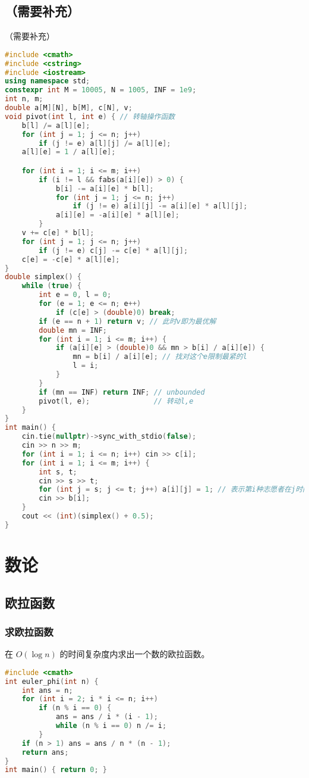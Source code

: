 \documentclass[9pt, a4paper, oneside]{book}
\begin{document}
\subsection{（需要补充）}
（需要补充）
\begin{lstlisting}[language={C++}]
#include <cmath>
#include <cstring>
#include <iostream>
using namespace std;
constexpr int M = 10005, N = 1005, INF = 1e9;
int n, m;
double a[M][N], b[M], c[N], v;
void pivot(int l, int e) { // 转轴操作函数
    b[l] /= a[l][e];
    for (int j = 1; j <= n; j++)
        if (j != e) a[l][j] /= a[l][e];
    a[l][e] = 1 / a[l][e];

    for (int i = 1; i <= m; i++)
        if (i != l && fabs(a[i][e]) > 0) {
            b[i] -= a[i][e] * b[l];
            for (int j = 1; j <= n; j++)
                if (j != e) a[i][j] -= a[i][e] * a[l][j];
            a[i][e] = -a[i][e] * a[l][e];
        }
    v += c[e] * b[l];
    for (int j = 1; j <= n; j++)
        if (j != e) c[j] -= c[e] * a[l][j];
    c[e] = -c[e] * a[l][e];
}
double simplex() {
    while (true) {
        int e = 0, l = 0;
        for (e = 1; e <= n; e++)
            if (c[e] > (double)0) break;
        if (e == n + 1) return v; // 此时v即为最优解
        double mn = INF;
        for (int i = 1; i <= m; i++) {
            if (a[i][e] > (double)0 && mn > b[i] / a[i][e]) {
                mn = b[i] / a[i][e]; // 找对这个e限制最紧的l
                l = i;
            }
        }
        if (mn == INF) return INF; // unbounded
        pivot(l, e);               // 转动l,e
    }
}
int main() {
    cin.tie(nullptr)->sync_with_stdio(false);
    cin >> n >> m;
    for (int i = 1; i <= n; i++) cin >> c[i];
    for (int i = 1; i <= m; i++) {
        int s, t;
        cin >> s >> t;
        for (int j = s; j <= t; j++) a[i][j] = 1; // 表示第i种志愿者在j时间可以服务
        cin >> b[i];
    }
    cout << (int)(simplex() + 0.5);
}\end{lstlisting}
\section{数论}
\subsection{欧拉函数}
\subsubsection{求欧拉函数}
在 $O(\log n)$ 的时间复杂度内求出一个数的欧拉函数。
\begin{lstlisting}[language={C++}]
#include <cmath>
int euler_phi(int n) {
    int ans = n;
    for (int i = 2; i * i <= n; i++)
        if (n % i == 0) {
            ans = ans / i * (i - 1);
            while (n % i == 0) n /= i;
        }
    if (n > 1) ans = ans / n * (n - 1);
    return ans;
}
int main() { return 0; }\end{lstlisting}
\end{document}
